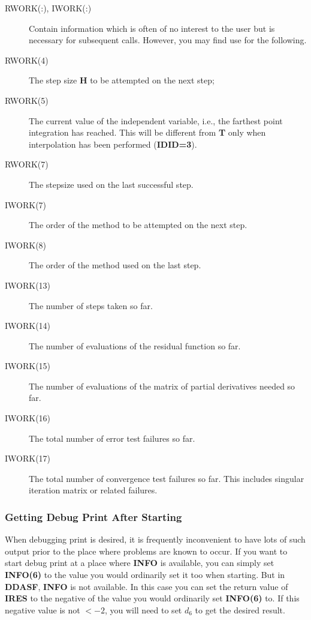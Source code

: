 \documentclass[twoside]{MATH77}
\begin{document}
\begin{description}
\item[RWORK(:), IWORK(:)] Contain information which is often of no
  interest to the user but is necessary for subsequent calls. However, you may
  find use for the following.
\item[RWORK(4)] The step size \textbf{H} to be attempted on the next step;
\item[RWORK(5)] The current value of the independent variable, i.e., the
  farthest point integration has reached. This will be different from
  \textbf{T} only when interpolation has been performed (\textbf{IDID=3}).
\item[RWORK(7)] The stepsize used on the last successful step.
\item[IWORK(7)] The order of the method to be attempted on the next step.
\item[IWORK(8)] The order of the method used on the last step.
\item[IWORK(13)] The number of steps taken so far.
\item[IWORK(14)] The number of evaluations of the residual function so far.
\item[IWORK(15)] The number of evaluations of the matrix of partial
  derivatives needed so far.
\item[IWORK(16)] The total number of error test failures so far.
\item[IWORK(17)] The total number of convergence test failures so far.  This
  includes singular iteration matrix or related failures.
\end{description}

\subsubsection{Getting Debug Print After Starting\label{debug}}

When debugging print is desired, it is frequently inconvenient to have lots of
such output prior to the place where problems are known to occur.  If you want
to start debug print at a place where \textbf{INFO} is available, you can
simply set \textbf{INFO(6)} to the value you would ordinarily set it too when
starting. But in \textbf{DDASF}, \textbf{INFO} is not available.  In this case
you can set the return value of \textbf{IRES} to the negative of the value you
would ordinarily set \textbf{INFO(6)} to.  If this negative value is not $< -
2$, you will need to set $d_6$ to get the desired result.
\end{document}
